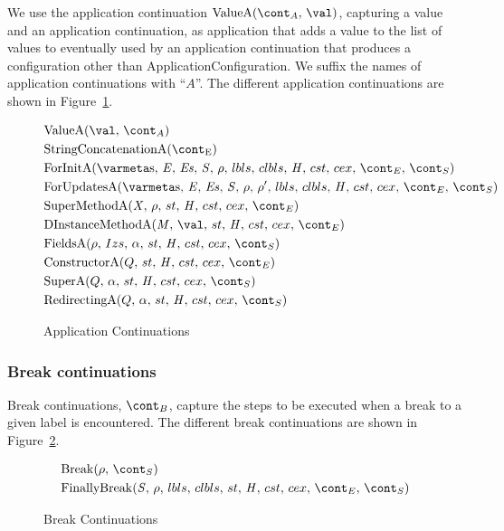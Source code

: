 \documentclass[a4paper,oneside]{article}
\begin{document}
We use the application continuation $\ValueA{\acont}{\val}$, capturing a value and an application continuation, as application that adds a value to the list of values to eventually used by an application continuation that produces a configuration other than ApplicationConfiguration.
We suffix the names of application continuations with ``$A$''.
The different application continuations are shown in Figure~\ref{figure:acont}.
\begin{figure}[Htp]
  \begin{align}
    &\ValueA{\val}{\acont} \label{acont:value}\\
    &\StringConcatenationA \label{acont:stringconcat}\\
    &\ForInitA \label{acont:forinit}\\
    &\ForUpdatesA{\env'} \label{acont:forupdates}\\
    &\SuperMethodA \label{acont:supermethod}\\
    &\DInstanceMethodA \label{acont:staticinv}\\
    &\FieldsA{\env}{Izs}{\loc}{\scont} \label{acont:fields}\\
    &\ConstructorA{Q}{\econt} \label{acont:constructor}\\
    &\SuperA{Q}{\loc}{\scont} \label{acont:super}\\
    &\RedirectingA{Q}{\loc}{\scont} \label{acont:redirecting}
  \end{align}
  \caption{Application Continuations}
  \label{figure:acont}
\end{figure}


\subsubsection{Break continuations}
\label{subsubsec:break-continuations}

Break continuations, $\bcont$, capture the steps to be executed when a break to a given label is encountered.
The different break continuations are shown in Figure~\ref{figure:breakcont}.
\newcommand{\Break}[2]{\mathrm{Break}(#1,\,#2)}
\newcommand{\FinallyBreak}[2]{\mathrm{FinallyBreak}({#1},\,\env,\,\lbls,\,\clbls,\,\strace,\,\handler,\,\cstrace,\,\cex,\,\econt,\,{#2})}

\begin{figure}[Htp]
  \begin{align}
    &\Break{\env}{\scont} \label{breakcont:break} \\
    &\FinallyBreak{\stmt}{\scont} \label{breakcont:finallybreak}
  \end{align}
  \caption{Break Continuations}
  \label{figure:breakcont}
\end{figure}
\end{document}
